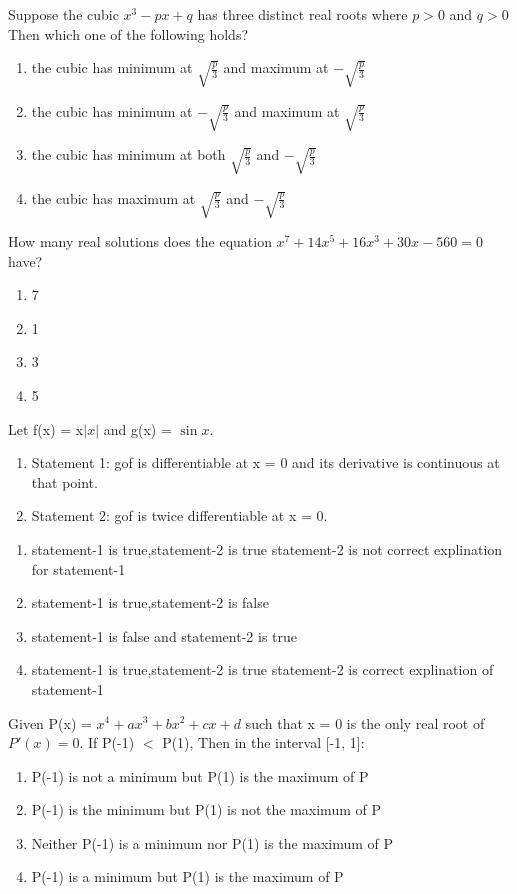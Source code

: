 \item Suppose the cubic $x^3 - px + q$ has three distinct real roots where $p > 0$ and $q > 0$ Then which one of the following holds?
\begin{enumerate}
\item the cubic has minimum at $\sqrt{\frac{p}{3}}$ and maximum at $-\sqrt{\frac{p}{3}}$
\item the cubic has minimum at $-\sqrt{\frac{p}{3}}$ and maximum at $\sqrt{\frac{p}{3}}$
\item the cubic has minimum at both  $\sqrt{\frac{p}{3}}$ and $-\sqrt{\frac{p}{3}}$
\item the cubic has maximum at $\sqrt{\frac{p}{3}}$ and  $-\sqrt{\frac{p}{3}}$
\end{enumerate}

\item How many real solutions does the equation $x^7 + 14x^5 + 16x^3 + 30x - 560 = 0$ have?
\begin{enumerate}
\item 7
\item 1
\item 3
\item 5
\end{enumerate}

\item Let f(x) = x$|x|$ and g(x) = $\sin x$.
\begin{enumerate}
\item Statement 1: gof is differentiable at x = 0 and its derivative is continuous at that point.
\item Statement 2: gof is twice differentiable at x = 0.
\end{enumerate}
\begin{enumerate}
\item statement-1 is true,statement-2 is true statement-2 is not correct explination for statement-1
\item statement-1 is true,statement-2 is false 
\item statement-1 is false and statement-2 is true 
\item statement-1 is true,statement-2 is true statement-2 is correct explination of statement-1
\end{enumerate}

\item Given P(x) = $x^4 + ax^3 + bx^2 + cx + d$ such that x = 0 is the only real root of $P'(x)=0$. If P(-1) $<$ P(1), Then in the interval [-1, 1]:
\begin{enumerate}
\item P(-1) is not a minimum but P(1) is the maximum of P
\item P(-1) is the minimum but P(1) is  not the maximum of P
\item Neither P(-1) is a minimum nor P(1) is the maximum of P
\item P(-1) is a minimum but P(1) is the maximum of P
\end{enumerate}


